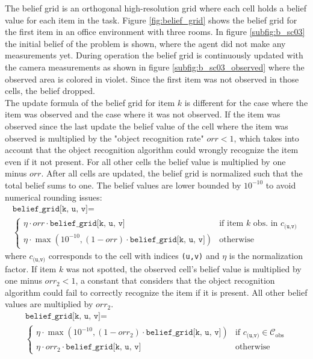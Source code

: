 The belief grid is an orthogonal high-resolution grid where each cell holds a belief value for each item in the task. Figure \ref{fig:belief_grid} shows the belief grid for the first item in an office environment with three rooms. In figure \ref{subfig:b_sc03} the initial belief of the problem is shown, where the agent did not make any measurements yet. During operation the belief grid is continuously updated with the camera measurements as shown in figure \ref{subfig:b_sc03_observed} where the observed area is colored in violet. Since the first item was not observed in those cells, the belief dropped.\\
The update formula of the belief grid for item $k$ is different for the case where the item was observed and the case where it was not observed. If the item was observed since the last update the belief value of the cell where the item was observed is multiplied by the "object recognition rate" $orr<1$, which takes into account that the object recognition algorithm could wrongly recognize the item even if it not present. For all other cells the belief value is multiplied by one minus $orr$. After all cells are updated, the belief grid is normalized such that the total belief sums to one. The belief values are lower bounded by $10^{-10}$ to avoid numerical rounding issues: 
%
\begin{multline}\label{eq:belief_grid1}
    \texttt{belief\_grid[k, u, v]} =\\ 
    \begin{cases} 
        \eta \cdot orr \cdot \texttt{belief\_grid[k, u, v]} &\text{if item $k$ obs. in }c_\texttt{(u,v)}\\
        \eta \cdot \max\left(10^{-10}, (1 - orr) \cdot \texttt{belief\_grid[k, u, v]}\right) &\text{otherwise}
    \end{cases}
\end{multline}
% 
where $c_\texttt{(u,v)}$ corresponds to the cell with indices \texttt{(u,v)} and $\eta$ is the normalization factor.
If item $k$ was not spotted, the observed cell's belief value is multiplied by one minus $orr_2<1$, a constant that considers that the object recognition algorithm could fail to correctly recognize the item if it is present. All other belief values are multiplied by $orr_2$. 
%
\begin{multline}\label{eq:belief_grid2}
    \texttt{belief\_grid[k, u, v]} =\\ 
    \begin{cases} 
        \eta \cdot\max\left(10^{-10}, (1 -  orr_2) \cdot \texttt{belief\_grid[k, u, v]}\right) &\text{if }c_\texttt{(u,v)} \in \mathcal{C}_\text{obs}\\
        \eta \cdot orr_2 \cdot \texttt{belief\_grid[k, u, v]} &\text{otherwise}
    \end{cases}
\end{multline}
